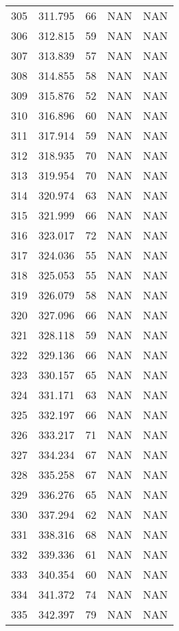 \documentclass{article}
\begin{document}
\begin{longtable}{@{}lllll@{}}
				305 & 311.795 & 66    & NAN   & NAN   \\
				306 & 312.815 & 59    & NAN   & NAN   \\
				307 & 313.839 & 57    & NAN   & NAN   \\
				308 & 314.855 & 58    & NAN   & NAN   \\
				309 & 315.876 & 52    & NAN   & NAN   \\
				310 & 316.896 & 60    & NAN   & NAN   \\
				311 & 317.914 & 59    & NAN   & NAN   \\
				312 & 318.935 & 70    & NAN   & NAN   \\
				313 & 319.954 & 70    & NAN   & NAN   \\
				314 & 320.974 & 63    & NAN   & NAN   \\
				315 & 321.999 & 66    & NAN   & NAN   \\
				316 & 323.017 & 72    & NAN   & NAN   \\
				317 & 324.036 & 55    & NAN   & NAN   \\
				318 & 325.053 & 55    & NAN   & NAN   \\
				319 & 326.079 & 58    & NAN   & NAN   \\
				320 & 327.096 & 66    & NAN   & NAN   \\
				321 & 328.118 & 59    & NAN   & NAN   \\
				322 & 329.136 & 66    & NAN   & NAN   \\
				323 & 330.157 & 65    & NAN   & NAN   \\
				324 & 331.171 & 63    & NAN   & NAN   \\
				325 & 332.197 & 66    & NAN   & NAN   \\
				326 & 333.217 & 71    & NAN   & NAN   \\
				327 & 334.234 & 67    & NAN   & NAN   \\
				328 & 335.258 & 67    & NAN   & NAN   \\
				329 & 336.276 & 65    & NAN   & NAN   \\
				330 & 337.294 & 62    & NAN   & NAN   \\
				331 & 338.316 & 68    & NAN   & NAN   \\
				332 & 339.336 & 61    & NAN   & NAN   \\
				333 & 340.354 & 60    & NAN   & NAN   \\
				334 & 341.372 & 74    & NAN   & NAN   \\
				335 & 342.397 & 79    & NAN   & NAN   \\

\end{longtable}
\end{document}
